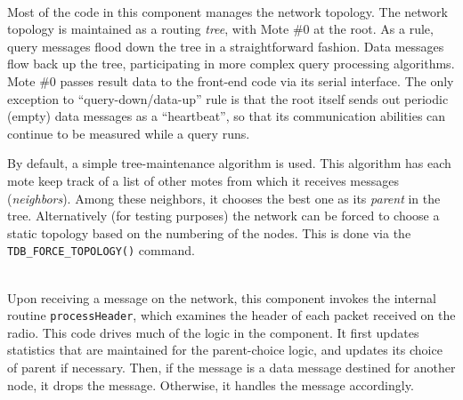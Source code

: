 \documentclass[11pt]{article}
\begin{document}
\vspace{1em}
\\ Most of the code in this
component manages the network topology.  The network topology is
maintained as a routing {\em tree}, with Mote \#0 at the root.  As a
rule, query messages flood down the tree in a straightforward fashion.
Data messages flow back up the tree, participating in more complex
query processing algorithms.  Mote \#0 passes result data to the
front-end code via its serial interface.  The only exception to
``query-down/data-up'' rule is that the root itself sends out periodic
(empty) data messages as a ``heartbeat'', so that its communication
abilities can continue to be measured while a query runs.

By default, a simple tree-maintenance algorithm is used.  This
algorithm has each mote keep track of a list of other motes from which
it receives messages ({\em neighbors}).  Among these neighbors, it
chooses the best one as its {\em parent} in the tree.  Alternatively
(for testing purposes) the network can be forced to choose a static
topology based on the numbering of the nodes.  This is done via the
{\tt TDB\_FORCE\_TOPOLOGY()} command.

\vspace{1em}
\\
Upon receiving a message on the network, this component invokes the
internal routine {\tt processHeader}, which examines the header of
each packet received on the radio.  This code drives much of the logic
in the component.  It first updates statistics that are maintained for
the parent-choice logic, and updates its choice of parent if
necessary.  Then, if the message is a data message destined for
another node, it drops the message.  Otherwise, it handles the message
accordingly.
\end{document}

